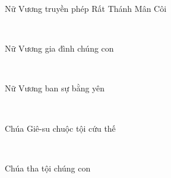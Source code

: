 \documentclass[12pt]{article}
\begin{document}
\begin{paracol}{2}
\begin{rightcolumn}
Nữ Vương truyền phép Rất Thánh Mân Côi\\
\end{rightcolumn}

\begin{leftcolumn*}
\Large{\ \ \ }\\
\end{leftcolumn*}

\begin{rightcolumn}
Nữ Vương gia đình chúng con\\
\end{rightcolumn}

\begin{leftcolumn*}
\Large{\ \ \ \ \ }\\
\end{leftcolumn*}

\begin{rightcolumn}
Nữ Vương ban sự bằng yên\\
\end{rightcolumn}

\begin{leftcolumn*}
\Large{\ \ \ \ \ \ \ \ }\\
\end{leftcolumn*}

\begin{rightcolumn}
Chúa Giê-su chuộc tội cứu thế\\
\end{rightcolumn}

\begin{leftcolumn*}
\Large{\ \ \ \ }\\
\end{leftcolumn*}

\begin{rightcolumn}
Chúa tha tội chúng con\\
\end{rightcolumn}

\begin{leftcolumn*}
\Large{\ \ \ \ \ \ \ \ }\\
\end{leftcolumn*}


\end{paracol}
\end{document}
